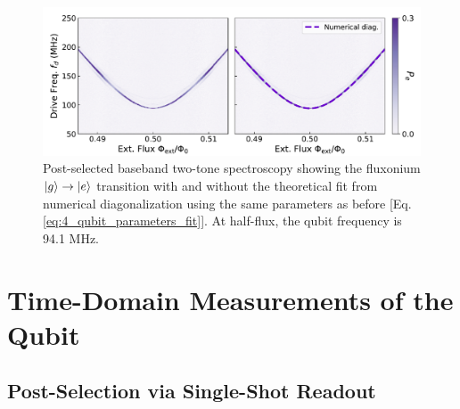 \begin{figure}[h]
    \centering
    \includegraphics[width=0.88\linewidth]{Figures/4/qubit_spectroscopy.pdf}
    \caption{Post-selected baseband two-tone spectroscopy showing the fluxonium $\lvert g\rangle\to\lvert e\rangle$ transition with and without the theoretical fit from numerical diagonalization using the same parameters as before [Eq. \eqref{eq:4_qubit_parameters_fit}]. At half-flux, the qubit frequency is 94.1 MHz.}
\label{fig:4_qubit_spectroscopy}
\end{figure}

\section{Time-Domain Measurements of the Qubit \label{sec:4_Time_Domain}}

\subsection{Post-Selection via Single-Shot Readout}

